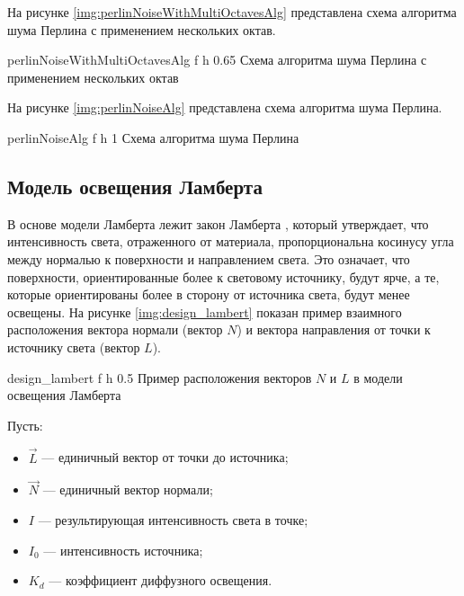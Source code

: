 \clearpage

На рисунке \ref{img:perlinNoiseWithMultiOctavesAlg} представлена схема алгоритма шума Перлина с применением нескольких октав.

{perlinNoiseWithMultiOctavesAlg} %
{f} %
{h} %
{0.65\textwidth} %
{Схема алгоритма шума Перлина с применением нескольких октав} %

\clearpage

На рисунке \ref{img:perlinNoiseAlg} представлена схема алгоритма шума Перлина.

{perlinNoiseAlg} %
{f} %
{h} %
{1\textwidth} %
{Схема алгоритма шума Перлина} %

\subsection{Модель освещения Ламберта}

В основе модели Ламберта лежит закон Ламберта \cite{info_lightLambert}, который утверждает, что интенсивность света, отраженного от материала, пропорциональна косинусу угла между нормалью к поверхности и направлением света. 
Это означает, что поверхности, ориентированные более к световому источнику, будут ярче, а те, которые ориентированы более в сторону от источника света, будут менее освещены.
На рисунке \ref{img:design_lambert} показан пример взаимного расположения вектора нормали (вектор $N$) и вектора направления от точки к источнику света (вектор $L$).

{design_lambert} %
{f} %
{h} %
{0.5\textwidth} %
{Пример расположения векторов $N$ и $L$ в модели освещения Ламберта \cite{info_lightModels}} %

Пусть:
\begin{itemize}
	\item $\vec{L}$ --- единичный вектор от точки до источника;
	\item $\vec{N}$ --- единичный вектор нормали;
	\item $I$ --- результирующая интенсивность света в точке;
	\item $I_0$ --- интенсивность источника;
	\item $K_d$ --- коэффициент диффузного освещения.
\end{itemize}


